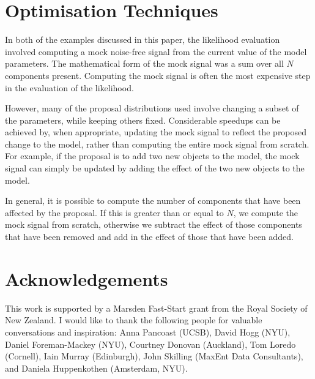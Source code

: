 \documentclass[letterpaper, 11pt]{article}
\begin{document}

\section{Optimisation Techniques}\label{sec:optimisation}
In both of the examples discussed in this paper, the likelihood evaluation
involved computing a mock noise-free signal from the current value of the
model parameters. The mathematical form of the mock signal was a sum over
all $N$ components present. Computing the mock signal is often the most
expensive step in the evaluation of the likelihood.

However, many of the proposal distributions used involve changing a subset
of the parameters, while keeping others fixed. Considerable speedups can be
achieved by, when appropriate, updating the mock signal to reflect the proposed
change to the model, rather than computing the entire mock signal from scratch.
For example, if the proposal is to add two new objects to the model, the
mock signal can simply be updated by adding the effect of the two new objects
to the model.

In general, it is possible to compute the number of components that have been
affected by the proposal. If this is greater than or equal to $N$, we compute
the mock signal from scratch, otherwise we subtract the effect of those
components that have been removed and add in the effect of those that have been
added.

\section*{Acknowledgements}
This work is supported by a Marsden Fast-Start grant
from the Royal Society of New Zealand. I would like to thank the following
people for valuable conversations and inspiration:
Anna Pancoast (UCSB), David Hogg (NYU), Daniel Foreman-Mackey (NYU),
Courtney Donovan (Auckland), Tom Loredo (Cornell), Iain Murray (Edinburgh),
John Skilling (MaxEnt Data Consultants), and Daniela Huppenkothen
(Amsterdam, NYU).
\end{document}
